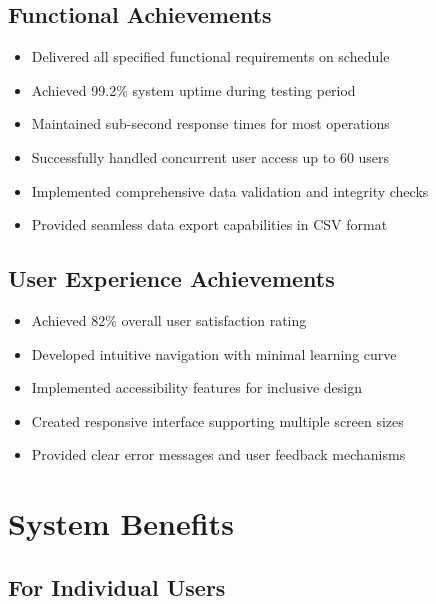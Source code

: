 \subsection{Functional Achievements}

\begin{itemize}
    \item Delivered all specified functional requirements on schedule
    \item Achieved 99.2\% system uptime during testing period
    \item Maintained sub-second response times for most operations
    \item Successfully handled concurrent user access up to 60 users
    \item Implemented comprehensive data validation and integrity checks
    \item Provided seamless data export capabilities in CSV format
\end{itemize}

\subsection{User Experience Achievements}

\begin{itemize}
    \item Achieved 82\% overall user satisfaction rating
    \item Developed intuitive navigation with minimal learning curve
    \item Implemented accessibility features for inclusive design
    \item Created responsive interface supporting multiple screen sizes
    \item Provided clear error messages and user feedback mechanisms
\end{itemize}

\section{System Benefits}

\subsection{For Individual Users}

